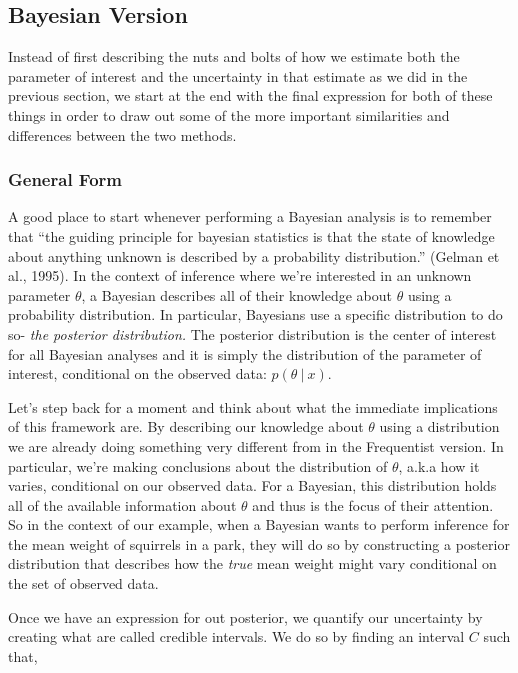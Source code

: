 \documentclass[12pt,twoside]{reedthesis}
\begin{document}
\hypertarget{bayesian-version}{%
\subsection{Bayesian Version}\label{bayesian-version}}

Instead of first describing the nuts and bolts of how we estimate both the parameter of interest and the uncertainty in that estimate as we did in the previous section, we start at the end with the final expression for both of these things in order to draw out some of the more important similarities and differences between the two methods.

\hypertarget{general-form}{%
\subsubsection{General Form}\label{general-form}}

A good place to start whenever performing a Bayesian analysis is to remember that ``the guiding principle for bayesian statistics is that the state of knowledge about anything unknown is described by a probability distribution.'' (Gelman et al., 1995). In the context of inference where we're interested in an unknown parameter \(\theta\), a Bayesian describes all of their knowledge about \(\theta\) using a probability distribution. In particular, Bayesians use a specific distribution to do so- \emph{the posterior distribution.} The posterior distribution is the center of interest for all Bayesian analyses and it is simply the distribution of the parameter of interest, conditional on the observed data: \(p(\theta \ | \ x)\).

Let's step back for a moment and think about what the immediate implications of this framework are. By describing our knowledge about \(\theta\) using a distribution we are already doing something very different from in the Frequentist version. In particular, we're making conclusions about the distribution of \(\theta\), a.k.a how it varies, conditional on our observed data. For a Bayesian, this distribution holds all of the available information about \(\theta\) and thus is the focus of their attention. So in the context of our example, when a Bayesian wants to perform inference for the mean weight of squirrels in a park, they will do so by constructing a posterior distribution that describes how the \emph{true} mean weight might vary conditional on the set of observed data.

Once we have an expression for out posterior, we quantify our uncertainty by creating what are called credible intervals. We do so by finding an interval \(C\) such that,
\end{document}
